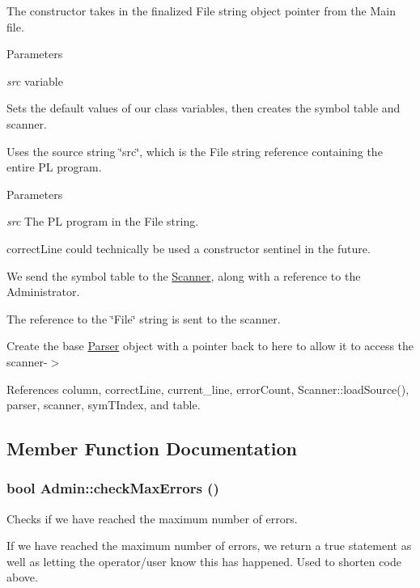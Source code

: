 The constructor takes in the finalized File string object pointer from the Main file. 
\begin{DoxyParams}{Parameters}
\item[{\em src}]variable\end{DoxyParams}
Sets the default values of our class variables, then creates the symbol table and scanner.

Uses the source string \char`\"{}src\char`\"{}, which is the File string reference containing the entire PL program.


\begin{DoxyParams}{Parameters}
\item[{\em src}]The PL program in the File string. \end{DoxyParams}


correctLine could technically be used a constructor sentinel in the future.

We send the symbol table to the \hyperlink{classScanner}{Scanner}, along with a reference to the Administrator.

The reference to the \char`\"{}File\char`\"{} string is sent to the scanner.

Create the base \hyperlink{classParser}{Parser} object with a pointer back to here to allow it to access the scanner-\/$>$ 



References column, correctLine, current\_\-line, errorCount, Scanner::loadSource(), parser, scanner, symTIndex, and table.



\subsection{Member Function Documentation}
\hypertarget{classAdmin_af5cd211ee7891ec1fec719bace4b678b}{
\subsubsection[{checkMaxErrors}]{\setlength{\rightskip}{0pt plus 5cm}bool Admin::checkMaxErrors ()}}
\label{classAdmin_af5cd211ee7891ec1fec719bace4b678b}


Checks if we have reached the maximum number of errors. 

If we have reached the maximum number of errors, we return a true statement as well as letting the operator/user know this has happened. Used to shorten code above.


